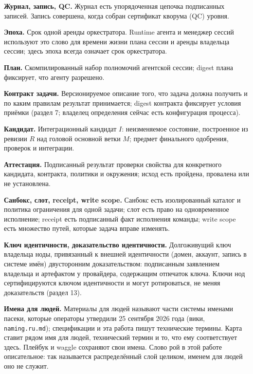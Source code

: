 \documentclass[11pt,a4paper]{article}
\begin{document}
\textbf{Журнал, запись, QC.} Журнал есть упорядоченная цепочка подписанных записей. Запись совершена, когда собран сертификат кворума (QC) уровня.

\textbf{Эпоха.} Срок одной аренды оркестратора. Runtime агента и менеджер сессий используют это слово для времени жизни плана сессии и аренды владельца сессии; здесь эпоха всегда означает срок оркестратора.

\textbf{План.} Скомпилированный набор полномочий агентской сессии; digest плана фиксирует, что агенту разрешено.

\textbf{Контракт задачи.} Версионируемое описание того, что задача должна получить и по каким правилам результат принимается; digest контракта фиксирует условия приёмки (раздел 7; владелец определения сейчас есть конфигурация процесса).

\textbf{Кандидат.} Интеграционный кандидат $I$: неизменяемое состояние, построенное из ревизии $R$ над головой основной ветки $M$; предмет финального одобрения, проверок и интеграции.

\textbf{Аттестация.} Подписанный результат проверки свойства для конкретного кандидата, контракта, политики и окружения; исход есть пройдена, провалена или не установлена.

\textbf{Санбокс, слот, receipt, write scope.} Санбокс есть изолированный каталог и политика ограничения для одной задачи; слот есть право на одновременное исполнение; receipt есть подписанный факт исполнения команды; write scope есть множество путей, которые задача вправе изменять.

\textbf{Ключ идентичности, доказательство идентичности.} Долгоживущий ключ владельца ноды, привязанный к внешней идентичности (домен, аккаунт, запись в системе имён) двусторонним доказательством: подписанным заявлением владельца и артефактом у провайдера, содержащим отпечаток ключа. Ключи нод сертифицируются ключом идентичности и могут ротироваться, не меняя доказательств (раздел 13).

\textbf{Имена для людей.} Материалы для людей называют части системы именами пасеки, которые операторы утвердили 25 сентября 2026 года (вики, \texttt{naming.ru.md}); спецификации и эта работа пишут технические термины. Карта ставит рядом имя для людей, технический термин и то, что ему соответствует здесь. Плейбук и waggle сохраняют свои имена. Слово рой в этой работе описательное: так называется распределённый слой целиком, именем для людей оно не служит.
\end{document}
